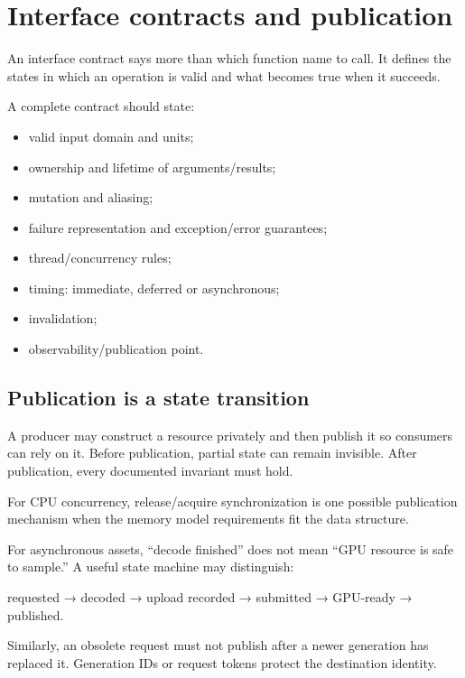 \hypertarget{appendix-fdae7ff0a23f}{}\label{referencestart:appendix-fdae7ff0a23f}
\section{Interface contracts and publication}\label{appendix-fdae7ff0a23f-interface-contracts-and-publication}

An interface contract says more than which function name to call. It defines the states in which an operation is valid and what becomes true when it succeeds.

A complete contract should state:

\begin{itemize}
\tightlist
\item
  valid input domain and units;
\item
  ownership and lifetime of arguments/results;
\item
  mutation and aliasing;
\item
  failure representation and exception/error guarantees;
\item
  thread/concurrency rules;
\item
  timing: immediate, deferred or asynchronous;
\item
  invalidation;
\item
  observability/publication point.
\end{itemize}

\subsection{Publication is a state transition}\label{appendix-fdae7ff0a23f-publication-is-a-state-transition}

A producer may construct a resource privately and then publish it so consumers can rely on it. Before publication, partial state can remain invisible. After publication, every documented invariant must hold.

For CPU concurrency, release/acquire synchronization is one possible publication mechanism when the memory model requirements fit the data structure.

For asynchronous assets, ``decode finished'' does not mean ``GPU resource is safe to sample.'' A useful state machine may distinguish:

requested → decoded → upload recorded → submitted → GPU-ready → published.

Similarly, an obsolete request must not publish after a newer generation has replaced it. Generation IDs or request tokens protect the destination identity.

